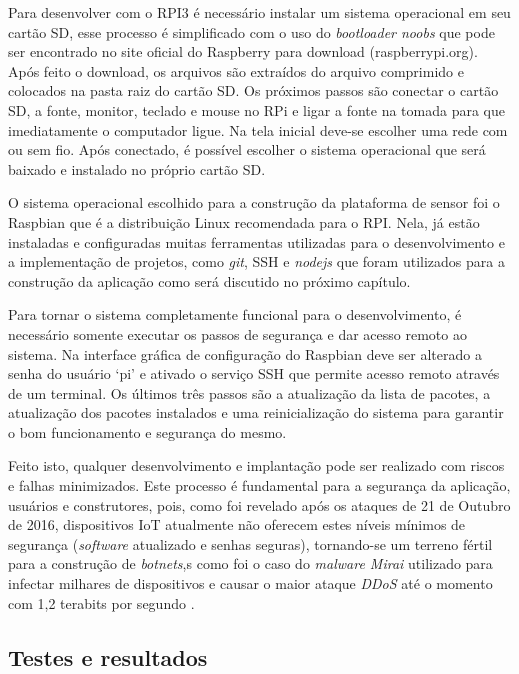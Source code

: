 Para desenvolver com o RPI3 é necessário instalar um sistema operacional
em seu cartão SD, esse processo é simplificado com o uso do \emph{bootloader noobs}
que pode ser encontrado no site oficial do Raspberry para download (raspberrypi.org). Após
feito o download, os arquivos são extraídos do arquivo comprimido e colocados na
pasta raiz do cartão SD. Os próximos passos são conectar o cartão SD, a fonte,
monitor, teclado e mouse no RPi e ligar a fonte na tomada
para que imediatamente o computador ligue. Na tela inicial deve-se escolher uma rede com ou sem fio.
Após conectado, é possível escolher o sistema operacional que será baixado e instalado no próprio cartão SD.

O sistema operacional escolhido para a construção da plataforma de sensor foi o
Raspbian que é a distribuição Linux recomendada para o RPI. Nela, já estão
instaladas e configuradas muitas ferramentas utilizadas para o desenvolvimento e
	a implementação de projetos, como \emph{git}, SSH e \emph{nodejs} que foram utilizados para a
construção da aplicação como será discutido no próximo capítulo.

Para tornar o sistema completamente funcional para o desenvolvimento, é
necessário somente executar os passos de segurança e dar acesso remoto
ao sistema. Na interface gráfica de configuração do Raspbian deve ser alterado
a senha do usuário ‘pi’ e ativado o serviço SSH que permite acesso remoto através
de um terminal. Os últimos três passos são a atualização da lista de pacotes,
a atualização dos pacotes instalados e uma reinicialização do sistema para
garantir o bom funcionamento e segurança do mesmo.

Feito isto, qualquer desenvolvimento e implantação pode ser realizado com riscos
e falhas minimizados. Este processo é fundamental para a segurança da aplicação,
usuários e construtores, pois, como foi revelado após os ataques de 21 de Outubro
de 2016, dispositivos IoT atualmente não oferecem estes níveis mínimos de
segurança (\emph{software} atualizado e senhas seguras), tornando-se um terreno
fértil para a construção de \emph{botnets},s como foi o caso do \emph{malware
Mirai} utilizado para infectar milhares de dispositivos e causar o maior ataque
\emph{DDoS} até o momento com 1,2 terabits por segundo
\cite{guardianMirai} \cite{nytimesMirai}.


\subsection{Testes e resultados}
\label{subsec:testes-rpi}

